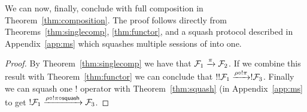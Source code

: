 
We can now, finally, conclude with full composition in Theorem~\ref{thm:composition}.
The proof follows directly from Theorems~\ref{thm:singlecomp}, \ref{thm:functor}, and a squash protocol described in Appendix~\ref{app:ms} which squashes multiple sessions of \F into one. 

\begin{proof}
By Theorem~\ref{thm:singlecomp} we have that $\mathcal{F}_1 \xrightarrow{\pi} \mathcal{F}_2$. If we combine this result with Theorem~\ref{thm:functor} we can conclude that $!!\mathcal{F}_1 \xrightarrow{\rho \circ !\pi} !\mathcal{F}_3$. 
Finally we can squash one $!$ operator with Theorem~\ref{thm:squash} (in Appendix~\ref{app:ms} to get $!\mathcal{F}_1 \xrightarrow{\rho \circ !\pi \circ \mathsf{squash}} \mathcal{F}_3$.
\end{proof}


